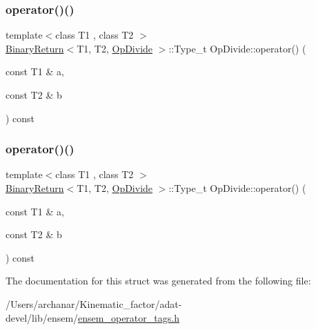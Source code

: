 \mbox{\label{structOpDivide_ae41ed8850cb38437e1b709a890e2fd79}} 
\subsubsection{\texorpdfstring{operator()()}{operator()()}\hspace{0.1cm}{\footnotesize\ttfamily [2/3]}}
{\footnotesize\ttfamily template$<$class T1 , class T2 $>$ \\
\mbox{\hyperlink{structBinaryReturn}{Binary\+Return}}$<$T1, T2, \mbox{\hyperlink{structOpDivide}{Op\+Divide}} $>$\+::Type\+\_\+t Op\+Divide\+::operator() (\begin{DoxyParamCaption}\item[{const T1 \&}]{a,  }\item[{const T2 \&}]{b }\end{DoxyParamCaption}) const\hspace{0.3cm}{\ttfamily [inline]}}

\mbox{\label{structOpDivide_ae41ed8850cb38437e1b709a890e2fd79}} 
\subsubsection{\texorpdfstring{operator()()}{operator()()}\hspace{0.1cm}{\footnotesize\ttfamily [3/3]}}
{\footnotesize\ttfamily template$<$class T1 , class T2 $>$ \\
\mbox{\hyperlink{structBinaryReturn}{Binary\+Return}}$<$T1, T2, \mbox{\hyperlink{structOpDivide}{Op\+Divide}} $>$\+::Type\+\_\+t Op\+Divide\+::operator() (\begin{DoxyParamCaption}\item[{const T1 \&}]{a,  }\item[{const T2 \&}]{b }\end{DoxyParamCaption}) const\hspace{0.3cm}{\ttfamily [inline]}}



The documentation for this struct was generated from the following file\+:\begin{DoxyCompactItemize}
\item 
/\+Users/archanar/\+Kinematic\+\_\+factor/adat-\/devel/lib/ensem/\mbox{\hyperlink{adat-devel_2lib_2ensem_2ensem__operator__tags_8h}{ensem\+\_\+operator\+\_\+tags.\+h}}\end{DoxyCompactItemize}
